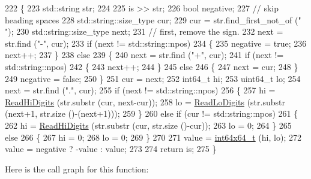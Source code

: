 \begin{DoxyCode}
222 \{
223   std::string str;
224 
225   is >> str;
226   \textcolor{keywordtype}{bool} negative;
227   \textcolor{comment}{// skip heading spaces}
228   std::string::size\_type cur;
229   cur = str.find\_first\_not\_of (\textcolor{stringliteral}{" "});
230   std::string::size\_type next;
231   \textcolor{comment}{// first, remove the sign.}
232   next = str.find (\textcolor{stringliteral}{"-"}, cur);
233   \textcolor{keywordflow}{if} (next != std::string::npos)
234     \{
235       negative = \textcolor{keyword}{true};
236       next++;
237     \}
238   \textcolor{keywordflow}{else}
239     \{
240       next = str.find (\textcolor{stringliteral}{"+"}, cur);
241       \textcolor{keywordflow}{if} (next != std::string::npos)
242         \{
243           next++;
244         \}
245       \textcolor{keywordflow}{else}
246         \{
247           next = cur;
248         \}
249       negative = \textcolor{keyword}{false};
250     \}
251   cur = next;
252   int64\_t hi;
253   uint64\_t lo;
254   next = str.find (\textcolor{stringliteral}{"."}, cur);
255   \textcolor{keywordflow}{if} (next != std::string::npos)
256     \{
257       hi = \hyperlink{group__highprec_gaa469dde0cf73e354d1e44a7501c53a53}{ReadHiDigits} (str.substr (cur, next-cur));
258       lo = \hyperlink{group__highprec_gab93a9afd92c0bdab641e9bd5f8d7fd1a}{ReadLoDigits} (str.substr (next+1, str.size ()-(next+1)));
259     \}
260   \textcolor{keywordflow}{else} \textcolor{keywordflow}{if} (cur != std::string::npos)
261     \{
262       hi = \hyperlink{group__highprec_gaa469dde0cf73e354d1e44a7501c53a53}{ReadHiDigits} (str.substr (cur, str.size ()-cur));
263       lo = 0;
264     \}
265   \textcolor{keywordflow}{else}
266     \{
267       hi = 0;
268       lo = 0;
269     \}
270 
271   value = \hyperlink{classint64x64__t}{int64x64\_t} (hi, lo);
272   value = negative ? -value : value;
273 
274   \textcolor{keywordflow}{return} is;
275 \}
\end{DoxyCode}


Here is the call graph for this function\+:


